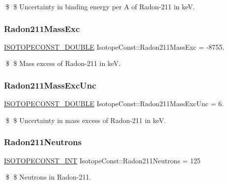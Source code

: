 \$ \$ Uncertainty in binding energy per A of Radon-\/211 in keV. \mbox{\label{group___isotope_const-_radon-_rn211_ga6dfa8a616f1d4afab8c938693790b7ae}} 
\subsubsection{\texorpdfstring{Radon211\+Mass\+Exc}{Radon211MassExc}}
{\footnotesize\ttfamily \mbox{\hyperlink{group___isotope_const-_macros_ga8f45a7272ce02c0b4c65c44636ed719a}{I\+S\+O\+T\+O\+P\+E\+C\+O\+N\+S\+T\+\_\+\+D\+O\+U\+B\+LE}} Isotope\+Const\+::\+Radon211\+Mass\+Exc = -\/8755.}

\$ \$ Mass excess of Radon-\/211 in keV. \mbox{\label{group___isotope_const-_radon-_rn211_ga3a77ba61eb74c68c10b2c9f075cbf144}} 
\subsubsection{\texorpdfstring{Radon211\+Mass\+Exc\+Unc}{Radon211MassExcUnc}}
{\footnotesize\ttfamily \mbox{\hyperlink{group___isotope_const-_macros_ga8f45a7272ce02c0b4c65c44636ed719a}{I\+S\+O\+T\+O\+P\+E\+C\+O\+N\+S\+T\+\_\+\+D\+O\+U\+B\+LE}} Isotope\+Const\+::\+Radon211\+Mass\+Exc\+Unc = 6.}

\$ \$ Uncertainty in mass excess of Radon-\/211 in keV. \mbox{\label{group___isotope_const-_radon-_rn211_gab7296c4ebcbba442fd0c861c4e2851e3}} 
\subsubsection{\texorpdfstring{Radon211\+Neutrons}{Radon211Neutrons}}
{\footnotesize\ttfamily \mbox{\hyperlink{group___isotope_const-_macros_ga5f18360b3e99483a35c32d789e62621c}{I\+S\+O\+T\+O\+P\+E\+C\+O\+N\+S\+T\+\_\+\+I\+NT}} Isotope\+Const\+::\+Radon211\+Neutrons = 125}

\$ \$ Neutrons in Radon-\/211. \mbox{\label{group___isotope_const-_radon-_rn211_gab73672f6ce34058ccb114980a4a053f7}} 
